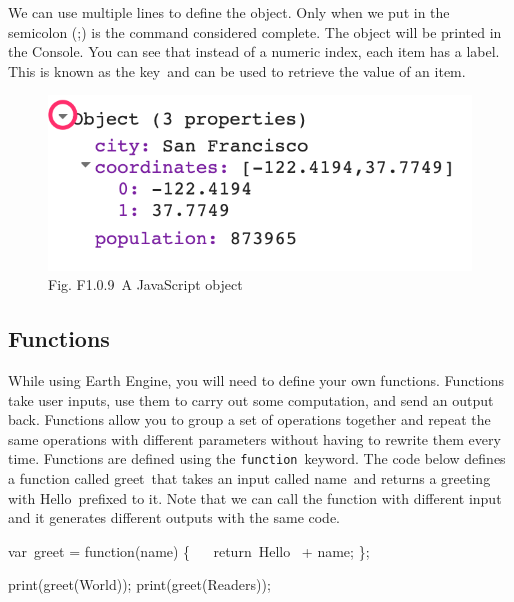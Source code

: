 \documentclass[
  letterpaper,
  DIV=11,
  numbers=noendperiod]{scrreprt}
\newenvironment{Shaded}{\begin{snugshade}}{\end{snugshade}}
\newcommand{\FunctionTok}[1]{\textcolor[rgb]{0.28,0.35,0.67}{#1}}
\newcommand{\KeywordTok}[1]{\textcolor[rgb]{0.00,0.23,0.31}{#1}}
\newcommand{\NormalTok}[1]{\textcolor[rgb]{0.00,0.23,0.31}{#1}}
\newcommand{\OperatorTok}[1]{\textcolor[rgb]{0.37,0.37,0.37}{#1}}
\newcommand{\StringTok}[1]{\textcolor[rgb]{0.13,0.47,0.30}{#1}}
\begin{document}
We can use multiple lines to define the object. Only when we put in the
semicolon (;) is the command considered complete. The object will be
printed in the Console. You can see that instead of a numeric index,
each item has a label. This is known as the key~and can be used to
retrieve the value of an item.

\begin{figure}

{\centering \includegraphics{./F1/image40.png}

}

\caption{Fig. F1.0.9~A JavaScript object}

\end{figure}

\hypertarget{functions}{%
\subsection*{Functions}\label{functions}}

While using Earth Engine, you will need to define your own functions.
Functions take user inputs, use them to carry out some computation, and
send an output back. Functions allow you to group a set of operations
together and repeat the same operations with different parameters
without having to rewrite them every time. Functions are defined using
the \texttt{function}~keyword. The code below defines a function called
greet~that takes an input called name~and returns a greeting with
Hello~prefixed to it. Note that we can call the function with different
input and it generates different outputs with the same code.

\begin{Shaded}
\begin{Highlighting}[]
\NormalTok{var greet }\OperatorTok{=} \KeywordTok{function}\NormalTok{(name) \{   }
\NormalTok{    return }\StringTok{\textquotesingle{}Hello \textquotesingle{}} \OperatorTok{+}\NormalTok{ name}\OperatorTok{;}  
\NormalTok{    \}}\OperatorTok{;}
    
\FunctionTok{print}\NormalTok{(}\FunctionTok{greet}\NormalTok{(}\StringTok{\textquotesingle{}World\textquotesingle{}}\NormalTok{))}\OperatorTok{;}  
\FunctionTok{print}\NormalTok{(}\FunctionTok{greet}\NormalTok{(}\StringTok{\textquotesingle{}Readers\textquotesingle{}}\NormalTok{))}\OperatorTok{;}
\end{Highlighting}
\end{Shaded}
\end{document}
